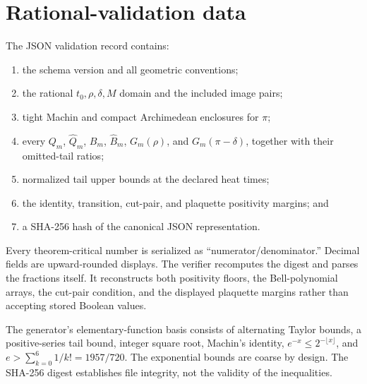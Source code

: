 \section{Rational-validation data}\label{app:schema}

The JSON validation record contains:
\begin{enumerate}
\item the schema version and all geometric conventions;
\item the rational $t_0,\rho,\delta,M$ domain and the included image pairs;
\item tight Machin and compact Archimedean enclosures for $\pi$;
\item every $Q_m$, $\widehat Q_m$, $B_m$, $\widehat B_m$, $G_m(\rho)$,
  and $G_m(\pi-\delta)$,
  together with their omitted-tail ratios;
\item normalized tail upper bounds at the declared heat times;
\item the identity, transition, cut-pair, and plaquette positivity margins; and
\item a SHA-256 hash of the canonical JSON representation.
\end{enumerate}
Every theorem-critical number is serialized as ``numerator/denominator.''
Decimal fields are upward-rounded displays.  The verifier recomputes the
digest and parses the fractions itself.  It reconstructs both positivity
floors, the Bell-polynomial arrays, the cut-pair condition, and the displayed
plaquette margins rather than accepting stored Boolean values.

The generator's elementary-function basis consists of alternating
Taylor bounds, a positive-series tail bound, integer square root, Machin's
identity, $e^{-x}\le2^{-\lfloor x\rfloor}$, and
$e>\sum_{k=0}^{6}1/k!=1957/720$.  The exponential bounds are coarse by
design.  The SHA-256 digest establishes file integrity, not the validity of
the inequalities.
